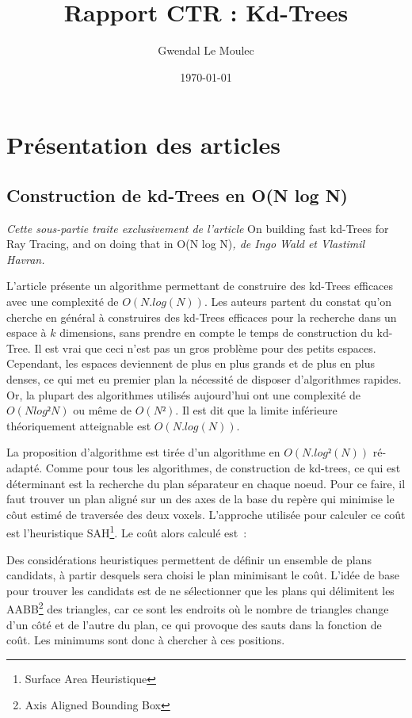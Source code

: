 \documentclass[a4paper]{article}
\title{Rapport CTR : Kd-Trees}
\author{Gwendal Le Moulec}
\date{\today}
\begin{document}
\section{Présentation des articles}

\subsection{Construction de kd-Trees en O(N log N)}

\textit{Cette sous-partie traite exclusivement de l'article} On building fast kd-Trees for Ray Tracing, and on doing that in O(N log N)\textit{, de Ingo Wald et Vlastimil Havran.}

L'article présente un algorithme permettant de construire des kd-Trees efficaces avec une complexité de $O(N.log(N))$. Les auteurs partent du constat qu'on cherche en général à construires des kd-Trees efficaces pour la recherche dans un espace à $k$ dimensions, sans prendre en compte le temps de construction du kd-Tree. Il est vrai que ceci n'est pas un gros problème pour des petits espaces. Cependant, les espaces deviennent de plus en plus grands et de plus en plus denses, ce qui met eu premier plan la nécessité de disposer d'algorithmes rapides. Or, la plupart des algorithmes utilisés aujourd'hui ont une complexité de $O(Nlog²N)$ ou même de $O(N²)$. Il est dit que la limite inférieure théoriquement atteignable est $O(N.log(N))$.

La proposition d'algorithme est tirée d'un algorithme en $O(N.log²(N))$ ré-adapté. Comme pour tous les algorithmes, de construction de kd-trees, ce qui est déterminant est la recherche du plan séparateur en chaque noeud. Pour ce faire, il faut trouver un plan aligné sur un des axes de la base du repère qui minimise le côut estimé de traversée des deux voxels. L'approche utilisée pour calculer ce coût est l'heuristique SAH\footnote{Surface Area Heuristique}. Le coût alors calculé est~:


Des considérations heuristiques permettent de définir un ensemble de plans candidats, à partir desquels sera choisi le plan minimisant le coût. L'idée de base pour trouver les candidats est de ne sélectionner que les plans qui délimitent les AABB\footnote{Axis Aligned Bounding Box} des triangles, car ce sont les endroits où le nombre de triangles change d'un c\^oté et de l'autre du plan, ce qui provoque des sauts dans la fonction de co\^ut. Les minimums sont donc à chercher à ces positions.
\end{document}

